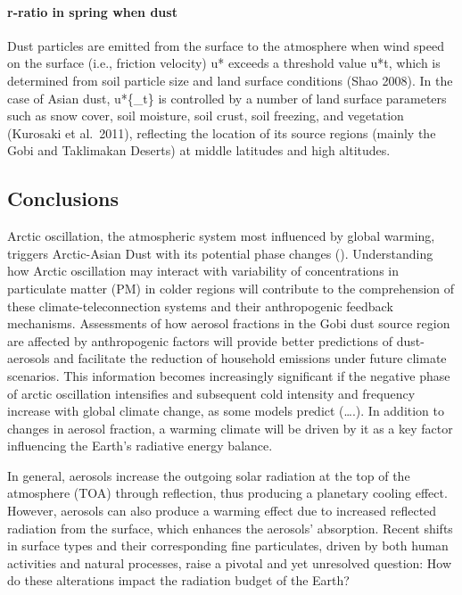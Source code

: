 \documentclass[
  11pt,
]{article}
\begin{document}
\paragraph{r-ratio in spring when
dust}\label{r-ratio-in-spring-when-dust}

Dust particles are emitted from the surface to the atmosphere when wind
speed on the surface (i.e., friction velocity) u* exceeds a threshold
value u*t, which is determined from soil particle size and land surface
conditions (Shao 2008). In the case of Asian dust, u*\{\_t\} is
controlled by a number of land surface parameters such as snow cover,
soil moisture, soil crust, soil freezing, and vegetation (Kurosaki et
al.~2011), reflecting the location of its source regions (mainly the
Gobi and Taklimakan Deserts) at middle latitudes and high altitudes.

\subsection{Conclusions}\label{conclusions}

Arctic oscillation, the atmospheric system most influenced by global
warming, triggers Arctic-Asian Dust with its potential phase changes ().
Understanding how Arctic oscillation may interact with variability of
concentrations in particulate matter (PM) in colder regions will
contribute to the comprehension of these climate-teleconnection systems
and their anthropogenic feedback mechanisms. Assessments of how aerosol
fractions in the Gobi dust source region are affected by anthropogenic
factors will provide better predictions of dust-aerosols and facilitate
the reduction of household emissions under future climate scenarios.
This information becomes increasingly significant if the negative phase
of arctic oscillation intensifies and subsequent cold intensity and
frequency increase with global climate change, as some models predict
(\ldots.). In addition to changes in aerosol fraction, a warming climate
will be driven by it as a key factor influencing the Earth's radiative
energy balance.

In general, aerosols increase the outgoing solar radiation at the top of
the atmosphere (TOA) through reflection, thus producing a planetary
cooling effect. However, aerosols can also produce a warming effect due
to increased reflected radiation from the surface, which enhances the
aerosols' absorption. Recent shifts in surface types and their
corresponding fine particulates, driven by both human activities and
natural processes, raise a pivotal and yet unresolved question: How do
these alterations impact the radiation budget of the Earth?
\end{document}
